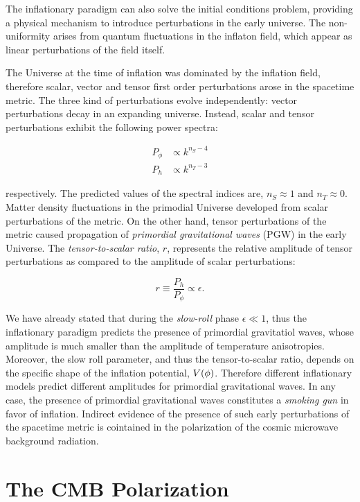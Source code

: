 The inflationary paradigm can also solve the initial conditions problem,
providing a physical mechanism to introduce perturbations in the early
universe. The non-uniformity arises from quantum fluctuations in the
inflaton field, which appear as linear perturbations of the field itself.

The Universe at the time of inflation was dominated by the inflation field,
therefore scalar, vector and tensor first order perturbations arose in
the spacetime metric. The three kind of perturbations evolve independently:
vector perturbations decay in an expanding universe. Instead, scalar and
tensor perturbations exhibit the following power spectra:

\begin{align}
        P_\phi & \propto k^{n_S - 4} \\
        P_h & \propto k^{n_T - 3}
\end{align}

respectively. The predicted values of the spectral
indices are, $n_S \approx 1$ and $n_T \approx 0$.
Matter density fluctuations in the primodial Universe developed from
scalar perturbations of the metric. On the other hand, tensor perturbations
of the metric caused propagation of \emph{primordial gravitational waves}
(PGW) in the early Universe. The \emph{tensor-to-scalar ratio}, $r$, represents
the relative amplitude of tensor perturbations as compared to the amplitude
of scalar perturbations:

\begin{equation}
        r \equiv \frac{P_h}{P_\phi} \propto \epsilon.
\end{equation}

We have already stated that during the \emph{slow-roll} phase $\epsilon \ll
1$, thus the inflationary paradigm predicts the presence of primordial
gravitatiol waves, whose amplitude is much smaller than the amplitude of
temperature anisotropies. Moreover, the slow roll parameter, and thus the
tensor-to-scalar ratio, depends on the specific shape of the inflation
potential, $V\qty(\phi)$. Therefore different inflationary models predict
different amplitudes for primordial gravitational waves. In any case, the
presence of primordial gravitational waves constitutes a \emph{smoking gun} in favor
of inflation. Indirect evidence of the presence of such early perturbations of
the spacetime metric is cointained in the polarization of the cosmic microwave
background radiation.

\section{The CMB Polarization}

